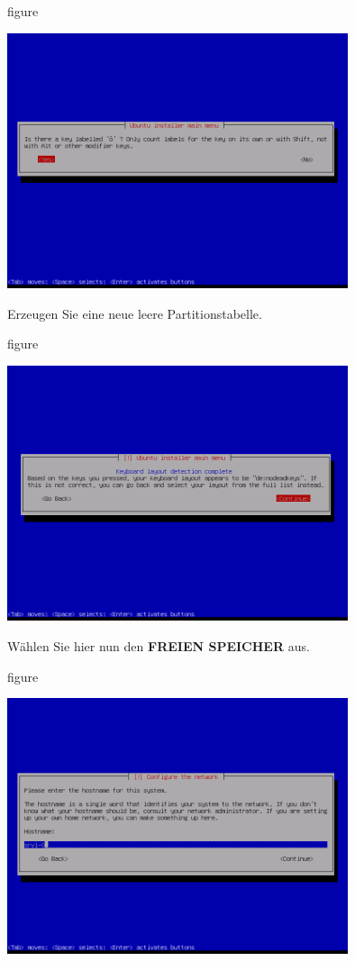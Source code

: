 \begin{nofloat}{figure}
\begin{center}
\includegraphics[width=0.75\textwidth]{screenshots/08_ubuntu_install.png}
\end{center}
\end{nofloat}

Erzeugen Sie eine neue leere Partitionstabelle.

\begin{nofloat}{figure}
\begin{center}
\includegraphics[width=0.75\textwidth]{screenshots/09_ubuntu_install.png}
\end{center}
\end{nofloat}

\pagebreak
Wählen Sie hier nun den \textbf{FREIEN SPEICHER} aus.

\begin{nofloat}{figure}
\begin{center}
\includegraphics[width=0.75\textwidth]{screenshots/10_ubuntu_install.png}
\end{center}
\end{nofloat}

